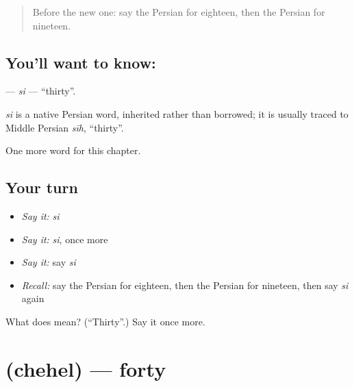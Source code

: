 \label{lesson:FA-C76-si}



\begin{quote}
Before the new one: say the Persian for eighteen, then the Persian for nineteen.
\end{quote}

\subsection*{You'll want to know: }
\textbf{} — \emph{si} — \textquotedblleft{}thirty\textquotedblright{}.

\begin{cousinweb}
\emph{si} is a native Persian word, inherited rather than borrowed; it is usually traced to Middle Persian \emph{sīh}, \textquotedblleft{}thirty\textquotedblright{}.
\end{cousinweb}

\begin{grammarlens}[title={What you've built}]
One more word for this chapter.
\end{grammarlens}

\subsection*{Your turn}
\begin{itemize}
\raggedright
  \item \emph{Say it:} \emph{si}
  \item \emph{Say it:} \emph{si}, once more
  \item \emph{Say it:} say \emph{si}
  \item \emph{Recall:} say the Persian for eighteen, then the Persian for nineteen, then say \emph{si} again
\end{itemize}

\begin{tcolorbox}[breakable,colback=teal!4,colframe=teal!35!black,title={Before you move on}]
What does  mean? (\textquotedblleft{}Thirty\textquotedblright{}.) Say it once more.
\end{tcolorbox}
\section[\texorpdfstring{\fa{چهل} (chehel)}{چهل (chehel)}]{ (chehel) — forty}

\label{lesson:FA-C76-chehel}



